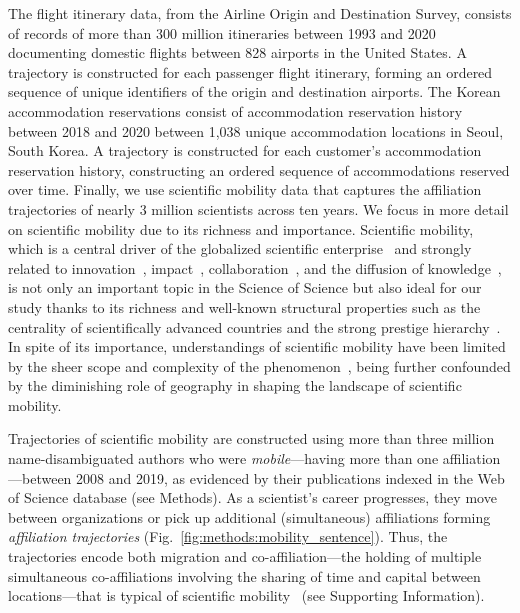 \documentclass[12pt]{article} %
\def\SI{Supporting Information}
\begin{document}
The flight itinerary data, from the Airline Origin and Destination Survey, consists of records of more than 300 million itineraries between 1993 and 2020 documenting domestic flights between 828 airports in the United States. 
A trajectory is constructed for each passenger flight itinerary, forming an ordered sequence of unique identifiers of the origin and destination airports. 
The Korean accommodation reservations consist of accommodation reservation history between 2018 and 2020 between 1,038 unique accommodation locations in Seoul, South Korea.
A trajectory is constructed for each customer's accommodation reservation history, constructing an ordered sequence of accommodations reserved over time.
Finally, we use scientific mobility data that captures the affiliation trajectories of nearly 3 million scientists across ten years.
We focus in more detail on scientific mobility due to its richness and importance. 
Scientific mobility, which is a central driver of the globalized scientific enterprise~\autocite{czaika2018globalisation, box2008competition} and strongly related to innovation~\autocite{braunerhjelm2020labor, kaiser2018innovation}, impact~\autocite{sugimoto2017mostimpact, petersen2018multiscale}, collaboration~\autocite{rodrigues2016mobility}, and the diffusion of knowledge~\autocite{braunerhjelm2020labor, morgan2018prestige}, is not only an important topic in the Science of Science but also ideal for our study thanks to its richness and well-known structural properties such as the centrality of scientifically advanced countries and the strong prestige hierarchy~\autocite{clauset2015hierarchy, deville2014career}. 
In spite of its importance, understandings of scientific mobility have been limited by the sheer scope and complexity of the phenomenon~\autocite{robinson2019mobility, deville2014career}, being further confounded by the diminishing role of geography in shaping the landscape of scientific mobility.

Trajectories of scientific mobility are constructed using more than three million name-disambiguated authors who were \textit{mobile}---having more than one affiliation---between 2008 and 2019, as evidenced by their publications indexed in the Web of Science database (see Methods).
As a scientist's career progresses, they move between organizations or pick up additional (simultaneous) affiliations forming \textit{affiliation trajectories} (Fig.~\ref{fig:methods:mobility_sentence}).
Thus, the trajectories encode both migration and co-affiliation---the holding of multiple simultaneous co-affiliations involving the sharing of time and capital between locations---that is typical of scientific mobility~\autocite{rodrigues2016mobility, sugimoto2017mostimpact} (see \SI).
\end{document}
